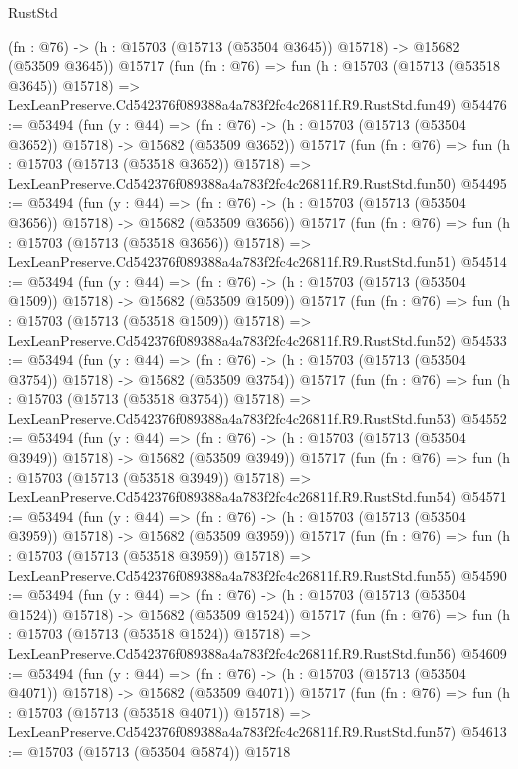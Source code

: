 \begin{lexlean}{RustStd}
\begin{coremodule}
    (fn : @76) -> (h : @15703 (@15713 (@53504 @3645)) @15718) -> @15682 (@53509 @3645))
    @15717
    (fun (fn : @76) =>
    fun (h : @15703 (@15713 (@53518 @3645)) @15718) =>
    LexLeanPreserve.Cd542376f089388a4a783f2fc4c26811f.R9.RustStd.fun49)
@54476 := @53494
    (fun (y : @44) =>
    (fn : @76) -> (h : @15703 (@15713 (@53504 @3652)) @15718) -> @15682 (@53509 @3652))
    @15717
    (fun (fn : @76) =>
    fun (h : @15703 (@15713 (@53518 @3652)) @15718) =>
    LexLeanPreserve.Cd542376f089388a4a783f2fc4c26811f.R9.RustStd.fun50)
@54495 := @53494
    (fun (y : @44) =>
    (fn : @76) -> (h : @15703 (@15713 (@53504 @3656)) @15718) -> @15682 (@53509 @3656))
    @15717
    (fun (fn : @76) =>
    fun (h : @15703 (@15713 (@53518 @3656)) @15718) =>
    LexLeanPreserve.Cd542376f089388a4a783f2fc4c26811f.R9.RustStd.fun51)
@54514 := @53494
    (fun (y : @44) =>
    (fn : @76) -> (h : @15703 (@15713 (@53504 @1509)) @15718) -> @15682 (@53509 @1509))
    @15717
    (fun (fn : @76) =>
    fun (h : @15703 (@15713 (@53518 @1509)) @15718) =>
    LexLeanPreserve.Cd542376f089388a4a783f2fc4c26811f.R9.RustStd.fun52)
@54533 := @53494
    (fun (y : @44) =>
    (fn : @76) -> (h : @15703 (@15713 (@53504 @3754)) @15718) -> @15682 (@53509 @3754))
    @15717
    (fun (fn : @76) =>
    fun (h : @15703 (@15713 (@53518 @3754)) @15718) =>
    LexLeanPreserve.Cd542376f089388a4a783f2fc4c26811f.R9.RustStd.fun53)
@54552 := @53494
    (fun (y : @44) =>
    (fn : @76) -> (h : @15703 (@15713 (@53504 @3949)) @15718) -> @15682 (@53509 @3949))
    @15717
    (fun (fn : @76) =>
    fun (h : @15703 (@15713 (@53518 @3949)) @15718) =>
    LexLeanPreserve.Cd542376f089388a4a783f2fc4c26811f.R9.RustStd.fun54)
@54571 := @53494
    (fun (y : @44) =>
    (fn : @76) -> (h : @15703 (@15713 (@53504 @3959)) @15718) -> @15682 (@53509 @3959))
    @15717
    (fun (fn : @76) =>
    fun (h : @15703 (@15713 (@53518 @3959)) @15718) =>
    LexLeanPreserve.Cd542376f089388a4a783f2fc4c26811f.R9.RustStd.fun55)
@54590 := @53494
    (fun (y : @44) =>
    (fn : @76) -> (h : @15703 (@15713 (@53504 @1524)) @15718) -> @15682 (@53509 @1524))
    @15717
    (fun (fn : @76) =>
    fun (h : @15703 (@15713 (@53518 @1524)) @15718) =>
    LexLeanPreserve.Cd542376f089388a4a783f2fc4c26811f.R9.RustStd.fun56)
@54609 := @53494
    (fun (y : @44) =>
    (fn : @76) -> (h : @15703 (@15713 (@53504 @4071)) @15718) -> @15682 (@53509 @4071))
    @15717
    (fun (fn : @76) =>
    fun (h : @15703 (@15713 (@53518 @4071)) @15718) =>
    LexLeanPreserve.Cd542376f089388a4a783f2fc4c26811f.R9.RustStd.fun57)
@54613 := @15703 (@15713 (@53504 @5874)) @15718

\end{coremodule}
\end{lexlean}

